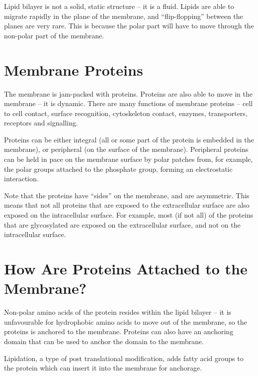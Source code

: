 Lipid bilayer is not a solid, static structure -- it is a fluid.
Lipids are able to migrate rapidly in the plane of the membrane, and ``flip-flopping'' between the planes are very rare.
This is because the polar part will have to move through the non-polar part of the membrane.

\section{Membrane Proteins}

The membrane is jam-packed with proteins.
Proteins are also able to move in the membrane -- it is dynamic.
There are many functions of membrane proteins -- cell to cell contact, surface recognition, cytoskeleton contact, enzymes, transporters, receptors and signalling.

Proteins can be either integral (all or some part of the protein is embedded in the membrane), or peripheral (on the surface of the membrane).
Peripheral proteins can be held in pace on the membrane surface by polar patches from, for example, the polar groups attached to the phosphate group, forming an electrostatic interaction.

Note that the proteins have ``sides'' on the membrane, and are asymmetric.
This means that not all proteins that are exposed to the extracellular surface are also exposed on the intracellular surface.
For example, most (if not all) of the proteins that are glycosylated are exposed on the extracellular surface, and not on the intracellular surface.

\section{How Are Proteins Attached to the Membrane?}

Non-polar amino acids of the protein resides within the lipid bilayer -- it is unfavourable for hydrophobic amino acids to move out of the membrane, so the proteins is anchored to the membrane.
Proteins can also have an anchoring domain that can be used to anchor the domain to the membrane.

Lipidation, a type of post translational modification, adds fatty acid groups to the protein which can insert it into the membrane for anchorage.








